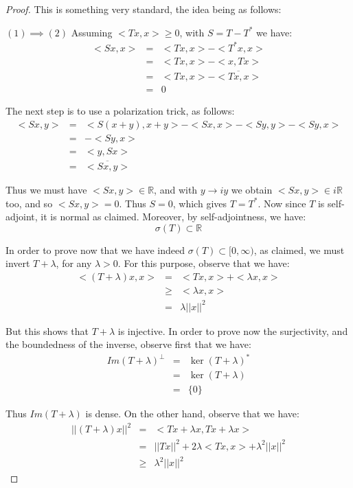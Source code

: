 \documentclass[12pt]{amsbook}
\begin{document}
\begin{proof}
This is something very standard, the idea being as follows:

\medskip

$(1)\implies(2)$ Assuming $<Tx,x>\geq0$, with $S=T-T^*$ we have:
\begin{eqnarray*}
<Sx,x>
&=&<Tx,x>-<T^*x,x>\\
&=&<Tx,x>-<x,Tx>\\
&=&<Tx,x>-\overline{<Tx,x>}\\
&=&0
\end{eqnarray*}

The next step is to use a polarization trick, as follows:
\begin{eqnarray*}
<Sx,y>
&=&<S(x+y),x+y>-<Sx,x>-<Sy,y>-<Sy,x>\\
&=&-<Sy,x>\\
&=&<y,Sx>\\
&=&\overline{<Sx,y>}
\end{eqnarray*}

Thus we must have $<Sx,y>\in\mathbb R$, and with $y\to iy$ we obtain $<Sx,y>\in i\mathbb R$ too, and so $<Sx,y>=0$. Thus $S=0$, which gives $T=T^*$. Now since $T$ is self-adjoint, it is normal as claimed. Moreover, by self-adjointness, we have:
$$\sigma(T)\subset\mathbb R$$

In order to prove now that we have indeed $\sigma(T)\subset[0,\infty)$, as claimed, we must invert $T+\lambda$, for any $\lambda>0$. For this purpose, observe that we have:
\begin{eqnarray*}
<(T+\lambda)x,x>
&=&<Tx,x>+<\lambda x,x>\\
&\geq&<\lambda x,x>\\
&=&\lambda||x||^2
\end{eqnarray*}

But this shows that $T+\lambda$ is injective. In order to prove now the surjectivity, and the boundedness of the inverse, observe first that we have:
\begin{eqnarray*}
Im(T+\lambda)^\perp
&=&\ker(T+\lambda)^*\\
&=&\ker(T+\lambda)\\
&=&\{0\}
\end{eqnarray*}

Thus $Im(T+\lambda)$ is dense. On the other hand, observe that we have:
\begin{eqnarray*}
||(T+\lambda)x||^2
&=&<Tx+\lambda x,Tx+\lambda x>\\
&=&||Tx||^2+2\lambda<Tx,x>+\lambda^2||x||^2\\
&\geq&\lambda^2||x||^2
\end{eqnarray*}


\end{proof}
\end{document}

